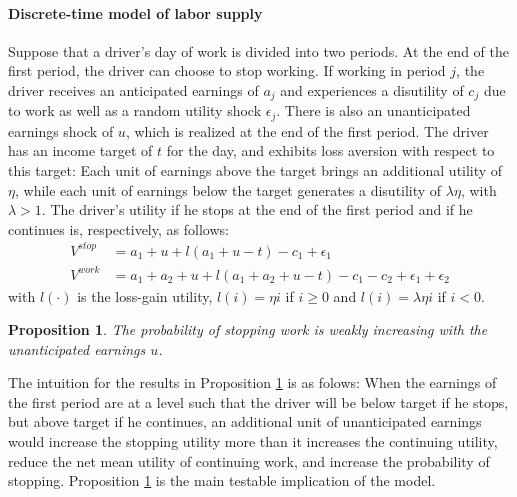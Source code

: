 \documentclass[reviewmode]{restat}
\newtheorem{proposition}{Proposition}
\begin{document}
\paragraph{Discrete-time model of labor supply} Suppose that a driver's day of work is divided into two periods.
At the end of the first period, the driver can choose to stop working. If working in period $j$, the driver
receives an anticipated earnings of $a_j$ and experiences a disutility of $c_j$ due to work as well as a
random utility shock $\epsilon_j$. There is also an unanticipated earnings shock of $u$, which is realized 
at the end of the first period. The driver has an income target of $t$ for the day, and exhibits loss 
aversion with respect to this target: Each unit of earnings above the target brings an additional utility
of $\eta$, while each unit of earnings below the target generates a disutility of $\lambda\eta$, 
with $\lambda > 1$. The driver's utility if he stops at the end of the first period and if he continues is, 
respectively, as follows:
\begin{align*}
V^{stop} &= a_1 + u + l(a_1+u-t) - c_1 + \epsilon_1 \\
V^{work} &= a_1 + a_2 + u + l(a_1+a_2+u-t) - c_1 - c_2 + \epsilon_1 + \epsilon_2   
\end{align*}
with $l(\cdot)$ is the loss-gain utility, $l(i) = \eta i$ if $i\geq0$ and $l(i) = \lambda\eta i$ if $i<0$. 
\begin{proposition}
\label{prop:unanticipated}
The probability of stopping work is weakly increasing with the unanticipated earnings $u$.
\end{proposition}


The intuition for the results in Proposition \ref{prop:unanticipated} is as folows: When the earnings of 
the first period are at a level such that the driver will be below target if he stops, but above target if
he continues, an additional unit of unanticipated earnings would increase the stopping utility more than it
increases the continuing utility, reduce the net mean utility of continuing work, and increase the
probability of stopping. Proposition \ref{prop:unanticipated} is the main testable implication of the model.
\end{document}
